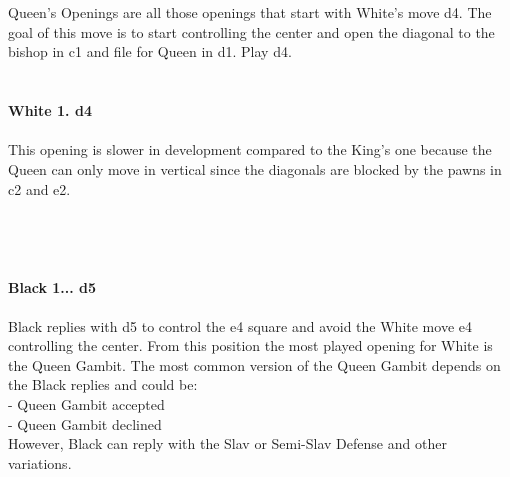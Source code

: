 \documentclass{article}
\begin{document}

\\
\\
Queen's Openings are all those openings that start with White's move d4. The goal of this move is to start controlling the center and open the diagonal to the bishop in c1 and file for Queen in d1. Play d4.\\

\\
\\
\textbf{White 1. d4}\\
\\
This opening is slower in development compared to the King's one because the Queen can only move in vertical since the diagonals are blocked by the pawns in c2 and e2.\\\\
\\

\\
\\
\textbf{Black 1... d5}\\
\\
Black replies with d5 to control the e4 square and avoid the White move e4 controlling the center. From this position the most played opening for White is the Queen Gambit. The most common version of the Queen Gambit depends on the Black replies and could be:\\- Queen Gambit accepted\\- Queen Gambit declined\\However, Black can reply with the Slav or Semi-Slav Defense and other variations.\\
\end{document}
